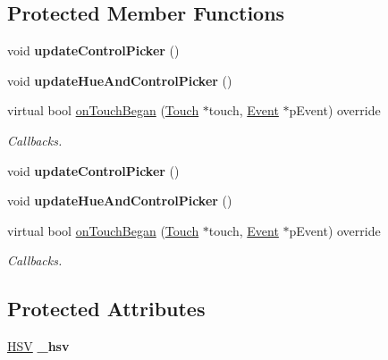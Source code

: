 \subsection*{Protected Member Functions}
\begin{DoxyCompactItemize}
\item 
\mbox{\label{classControlColourPicker_a503cd641e47ecd3f65be7eb4c808e885}} 
void {\bfseries update\+Control\+Picker} ()
\item 
\mbox{\label{classControlColourPicker_a940dc81a05fc172589be3d99e040e3b8}} 
void {\bfseries update\+Hue\+And\+Control\+Picker} ()
\item 
virtual bool \hyperlink{classControlColourPicker_a83493e9deb3c69dd40be99009a4759d6}{on\+Touch\+Began} (\hyperlink{classTouch}{Touch} $\ast$touch, \hyperlink{classEvent}{Event} $\ast$p\+Event) override
\begin{DoxyCompactList}\small\item\em Callbacks. \end{DoxyCompactList}\item 
\mbox{\label{classControlColourPicker_a503cd641e47ecd3f65be7eb4c808e885}} 
void {\bfseries update\+Control\+Picker} ()
\item 
\mbox{\label{classControlColourPicker_a940dc81a05fc172589be3d99e040e3b8}} 
void {\bfseries update\+Hue\+And\+Control\+Picker} ()
\item 
virtual bool \hyperlink{classControlColourPicker_aec95ec2b1f58342568c73ecd208d6a12}{on\+Touch\+Began} (\hyperlink{classTouch}{Touch} $\ast$touch, \hyperlink{classEvent}{Event} $\ast$p\+Event) override
\begin{DoxyCompactList}\small\item\em Callbacks. \end{DoxyCompactList}\end{DoxyCompactItemize}
\subsection*{Protected Attributes}
\begin{DoxyCompactItemize}
\item 
\mbox{\label{classControlColourPicker_a018c107deb0db06e4640a95cd2a77ff2}} 
\hyperlink{structHSV}{H\+SV} {\bfseries \+\_\+hsv}
\end{DoxyCompactItemize}
